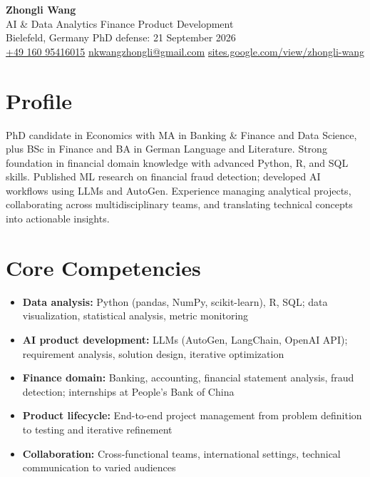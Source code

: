 \documentclass[a4paper,11pt]{article}
\begin{document}
\begin{center}
  {\LARGE\textbf{\textcolor{accent}{Zhongli Wang}}}\\[3pt]
  {\large AI \& Data Analytics \textbar{} Finance \textbar{} Product Development}\\[3pt]
  Bielefeld, Germany \textbar{} PhD defense: 21 September 2026\\[2pt]
  \href{tel:+4916095416015}{+49 160 95416015} \textbar{}
  \href{mailto:nkwangzhongli@gmail.com}{nkwangzhongli@gmail.com} \textbar{}
  \href{https://sites.google.com/view/zhongli-wang/}{sites.google.com/view/zhongli-wang}
\end{center}

\section{Profile}
PhD candidate in Economics with MA in Banking \& Finance and Data Science, plus BSc in Finance and BA in German Language and Literature. 
Strong foundation in financial domain knowledge with advanced Python, R, and SQL skills. 
Published ML research on financial fraud detection; developed AI workflows using LLMs and AutoGen. 
Experience managing analytical projects, collaborating across multidisciplinary teams, and translating technical concepts into actionable insights.

\section{Core Competencies}
\begin{itemize}
  \item \textbf{Data analysis:} Python (pandas, NumPy, scikit-learn), R, SQL; data visualization, statistical analysis, metric monitoring
  \item \textbf{AI product development:} LLMs (AutoGen, LangChain, OpenAI API); requirement analysis, solution design, iterative optimization
  \item \textbf{Finance domain:} Banking, accounting, financial statement analysis, fraud detection; internships at People's Bank of China
  \item \textbf{Product lifecycle:} End-to-end project management from problem definition to testing and iterative refinement
  \item \textbf{Collaboration:} Cross-functional teams, international settings, technical communication to varied audiences
\end{itemize}
\end{document}
